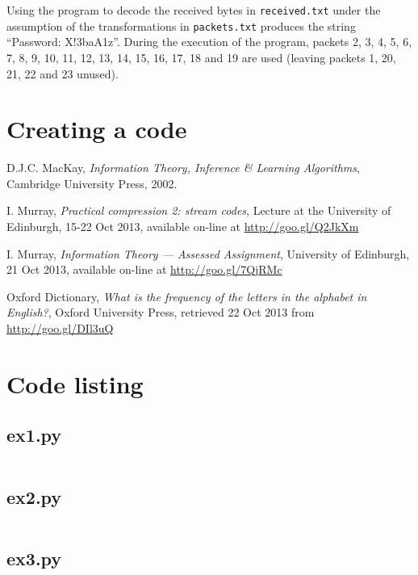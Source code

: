 \documentclass[10pt,a4paper,oneside,onecolumn]{article}
\newcommand*{\receivedTXT}{{\tt received.txt}\xspace}
\newcommand*{\packetsTXT}{{\tt packets.txt}\xspace}
\begin{document}
Using the program to decode the received bytes in \receivedTXT under the
assumption of the transformations in \packetsTXT produces the string ``Password:
X!3baA1z''. During the execution of the program, packets 2, 3, 4, 5, 6, 7, 8, 9,
10, 11, 12, 13, 14, 15, 16, 17, 18 and 19 are used (leaving packets 1, 20, 21,
22 and 23 unused).

\section{Creating a code}\label{sec:ex8}


\begin{thebibliography}{9}

    D.J.C. MacKay,
    \emph{Information Theory, Inference \& Learning Algorithms},
    Cambridge University Press,
    2002.

    I. Murray,
    \emph{Practical compression 2: stream codes},
    Lecture at the University of Edinburgh,
    15-22 Oct 2013,
    available on-line at \url{http://goo.gl/Q2JkXm}

    I. Murray,
    \emph{Information Theory — Assessed Assignment},
    University of Edinburgh,
    21 Oct 2013,
    available on-line at \url{http://goo.gl/7QjRMc}

    Oxford Dictionary,
    \emph{What is the frequency of the letters in the alphabet in English?},
    Oxford University Press,
    retrieved 22 Oct 2013 from \url{http://goo.gl/DIl3uQ}

\end{thebibliography}


\onecolumn
\appendixpage
\appendix

\section{Code listing}

\subsection{ex1.py}\label{app:ex1}
\inputminted{python}{../src/ex1.py}
\newpage

\subsection{ex2.py}\label{app:ex2}
\inputminted{python}{../src/ex2.py}
\newpage

\subsection{ex3.py}\label{app:ex3}
\inputminted{python}{../src/ex3.py}
\newpage
\end{document}
